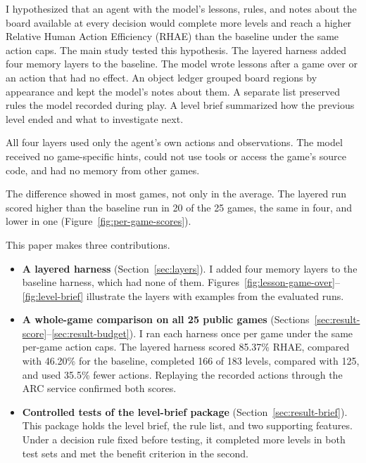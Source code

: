 I hypothesized that an agent with the model's lessons, rules, and notes about the board available at every decision would complete more levels and reach a higher Relative Human Action Efficiency (RHAE) than the baseline under the same action caps. The main study tested this hypothesis. The layered harness added four memory layers to the baseline. The model wrote lessons after a game over or an action that had no effect. An object ledger grouped board regions by appearance and kept the model's notes about them. A separate list preserved rules the model recorded during play. A level brief summarized how the previous level ended and what to investigate next.

All four layers used only the agent's own actions and observations. The model received no game-specific hints, could not use tools or access the game's source code, and had no memory from other games.

The difference showed in most games, not only in the average. The layered run scored higher than the baseline run in 20 of the 25 games, the same in four, and lower in one (Figure~\ref{fig:per-game-scores}).



This paper makes three contributions.
\begin{itemize}
\item \textbf{A layered harness} (Section~\ref{sec:layers}). I added four memory layers to the baseline harness, which had none of them. Figures~\ref{fig:lesson-game-over}--\ref{fig:level-brief} illustrate the layers with examples from the evaluated runs.
\item \textbf{A whole-game comparison on all 25 public games} (Sections~\ref{sec:result-score}--\ref{sec:result-budget}). I ran each harness once per game under the same per-game action caps. The layered harness scored 85.37\% RHAE, compared with 46.20\% for the baseline, completed 166 of 183 levels, compared with 125, and used 35.5\% fewer actions. Replaying the recorded actions through the ARC service confirmed both scores.
\item \textbf{Controlled tests of the level-brief package} (Section~\ref{sec:result-brief}). This package holds the level brief, the rule list, and two supporting features. Under a decision rule fixed before testing, it completed more levels in both test sets and met the benefit criterion in the second.
\end{itemize}

